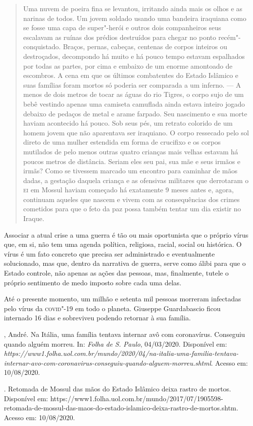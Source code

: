 \begin{quote}
Uma nuvem de poeira fina se levantou, irritando ainda mais os
olhos e as narinas de todos. Um jovem soldado usando uma bandeira
iraquiana como se fosse uma capa de super"-herói e outros dois
companheiros seus escalavam as ruínas dos prédios destruídos para chegar
no ponto recém"-conquistado. Braços, pernas, cabeças, centenas de corpos
inteiros ou destroçados, decompondo há muito e há pouco tempo estavam
espalhados por todas as partes, por cima e embaixo de um enorme
amontoado de escombros. A cena em que os últimos combatentes do Estado
Islâmico e suas famílias foram mortos só poderia ser comparada a um
inferno. --- A menos de dois metros de tocar as águas do rio Tigres, o
corpo sujo de um bebê vestindo apenas uma camiseta camuflada ainda
estava inteiro jogado debaixo de pedaços de metal e arame farpado. Seu
nascimento e sua morte haviam acontecido há pouco. Sob seus pés, um
retrato colorido de um homem jovem que não aparentava ser iraquiano. O
corpo ressecado pelo sol direto de uma mulher estendida em forma de
crucifixo e os corpos mutilados de pelo menos outras quatro crianças
mais velhas estavam há poucos metros de distância. Seriam eles seu pai,
sua mãe e seus irmãos e irmãs? Como se tivessem marcado um encontro para
caminhar de mãos dadas, a gestação daquela criança e as ofensivas
militares que derrotaram o \textsc{ei} em Mossul haviam começado há exatamente 9
meses antes e, agora, continuam aqueles que nascem e vivem com as
consequências dos crimes cometidos para que o feto da paz possa também
tentar um dia existir no Iraque.
\end{quote}

Associar a atual crise a uma guerra é tão ou mais oportunista que o
próprio vírus que, em si, não tem uma agenda política, religiosa,
racial, social ou histórica. O vírus é um fato concreto que precisa ser
administrado e eventualmente solucionado, mas que, dentro da narrativa
de guerra, serve como álibi para que o Estado controle, não apenas as
ações das pessoas, mas, finalmente, tutele o próprio sentimento de medo
imposto sobre cada uma delas.

Até o presente momento, um milhão e setenta mil pessoas morreram
infectadas pelo vírus da \textsc{covid}"-19 em todo o planeta. Giuseppe
Guardabascio ficou internado 16 dias e sobreviveu podendo retornar à sua
família.

\begin{bibliohedra}
, André. Na Itália, uma família tentava internar avô com
coronavírus. Conseguiu quando alguém morreu. In: \emph{Folha de S.
Paulo}, 04/03/2020. Disponível em:
\emph{https://www1.folha.uol.com.br/mundo/2020/04/na-italia-uma-familia-tentava-internar-avo-com-coronavirus-conseguiu-quando-alguem-morreu.shtml}.
Acesso em: 10/08/2020.

\titidem. Retomada de Mossul das mãos do Estado Islâmico deixa
rastro de mortos. Disponível em:
https://www1.folha.uol.com.br/mundo/2017/07/1905598-retomada-de-mossul-das-maos-do-estado-islamico-deixa-rastro-de-mortos.shtm.
Acesso em: 10/08/2020.
\end{bibliohedra}


